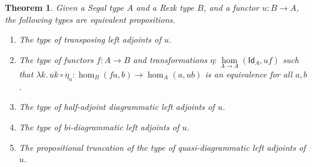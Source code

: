 \documentclass[12pt]{amsart}
\theoremstyle{plain}
\newtheorem{thm}{Theorem}[section]
\theoremstyle{definition}
\theoremstyle{remark}
\numberwithin{equation}{section}
\def\nat#1#2{\underset{#1\to#2}{\hom}}
\newcommand{\lam}[1]{\lambda #1.\,}
\newcommand{\idfunc}[1]{\mathsf{Id}_{#1}}
\begin{document}
\begin{thm}\label{thm:rezk-adj-prop}
  Given a Segal type $A$ and a Rezk type $B$, and a functor $u:B\to A$, the following types are equivalent propositions.
  \begin{enumerate}[label=(\roman*)]
  \item The type of transposing left adjoints of $u$.\label{item:rap1}
  \item The type of functors $f:A\to B$ and transformations $\eta:\nat AA (\idfunc A,uf)$ such that $\lam{k} u k \circ \eta_a : \hom_B(fa,b) \to \hom_A(a,ub) $ is an equivalence for all $a,b$.\label{item:rap1a}
  \item The type of half-adjoint diagrammatic left adjoints of $u$.\label{item:rap2}
  \item The type of bi-diagrammatic left adjoints of $u$.\label{item:rap3}
  \item The propositional truncation of the type of quasi-diagrammatic left adjoints of $u$.\label{item:rap4}
  \end{enumerate}
\end{thm}
\end{document}
